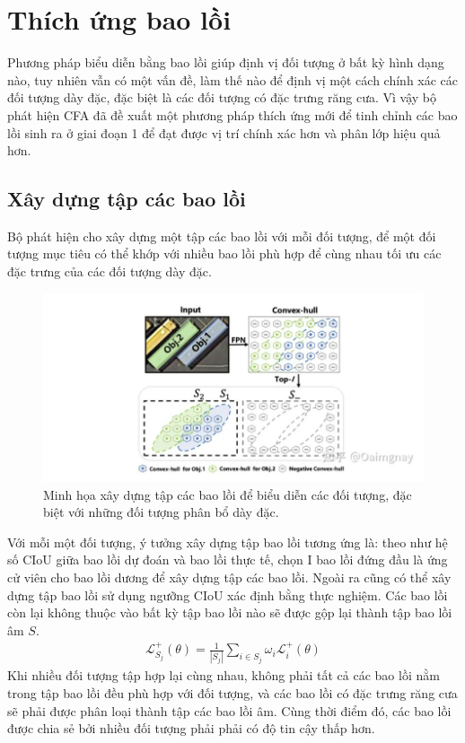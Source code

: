 \documentclass[12pt,a4paper,openany,oneside]{report}
\begin{document}
\section{Thích ứng bao lồi}
Phương pháp biểu diễn bằng bao lồi giúp định vị đối tượng ở bất kỳ hình dạng nào, tuy nhiên vẫn có một vấn đề, làm thế nào để định vị một cách chính xác các đối tượng dày đặc, đặc biệt là các đối tượng có đặc trưng răng cưa. Vì vậy bộ phát hiện CFA đã đề xuất một phương pháp thích ứng mới để tinh chỉnh các bao lồi sinh ra ở giai đoạn 1 để đạt được vị trí chính xác hơn và phân lớp hiệu quả hơn.
\subsection{Xây dựng tập các bao lồi}
Bộ phát hiện cho xây dựng một tập các bao lồi với mỗi đối tượng, để một đối tượng mục tiêu có thể khớp với nhiều bao lồi phù hợp để cùng nhau tối ưu các đặc trưng của các đối tượng dày đặc.

\begin{figure}[ht!]
	\begin{center}
		\includegraphics[width=445px]{./construction_convex_hull_set.jpg}
		\caption{Minh họa xây dựng tập các bao lồi để biểu diễn các đối tượng, đặc biệt với những đối tượng phân bổ dày đặc.}
		\label{fig_dhandang1}
	\end{center}
\end{figure} 
Với mỗi một đối tượng, ý tưởng xây dựng tập bao lồi tương ứng là: theo như hệ số CIoU giữa bao lồi dự đoán và bao lồi thực tế, chọn I bao lồi đứng đầu là ứng cử viên cho bao lồi dương để xây dựng tập các bao lồi. Ngoài ra cũng có thể xây dựng tập bao lồi sử dụng ngưỡng CIoU xác định bằng thực nghiệm. Các bao lồi còn lại không thuộc vào bất kỳ tập bao lồi nào sẽ được gộp lại thành tập bao lồi âm $S$.
\begin{align} \label{construct_convex_hull_set}
\mathcal{L}_{S_j}^{+}(\theta)=\frac{1}{\left|S_j\right|} \sum_{i \in S_j} \omega_i \mathcal{L}_i^{+}(\theta)
\end{align}
Khi nhiều đối tượng tập hợp lại cùng nhau, không phải tất cả các bao lồi nằm trong tập bao lồi đều phù hợp với đối tượng, và các bao lồi có đặc trưng răng cưa sẽ phải được phân loại thành tập các bao lồi âm. Cùng thời điểm đó, các bao lồi được chia sẻ bởi nhiều đối tượng phải phải có độ tin cậy thấp hơn.
\end{document}
